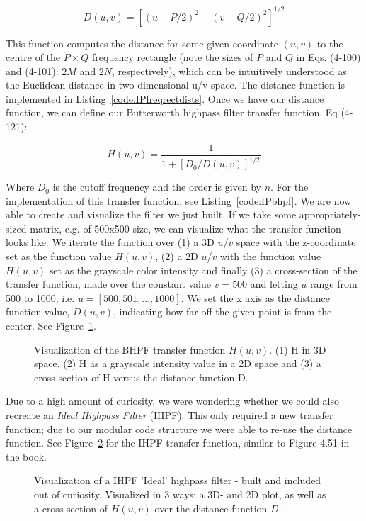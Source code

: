 \documentclass{article}
\begin{document}
\[
D(u,v)=[(u-P/2)^2+(v-Q/2)^2]^{1/2}
\]

This function computes the distance for some given coordinate $(u, v)$ to the centre of the $P \times Q$ frequency rectangle (note the sizes of $P$ and $Q$ in Eqs. (4-100) and (4-101): $2M$ and $2N$, respectively), which can be intuitively understood as the Euclidean distance in two-dimensional u/v space. The distance function is implemented in  Listing~\ref{code:IPfreqrectdists}. Once we have our distance function, we can define our Butterworth highpass filter transfer function, Eq (4-121):

\[
H(u, v) = \frac{1}{1+[D_0 / D(u, v)]^{1/2}}
\]

Where $D_0$ is the cutoff frequency and the order is given by $n$. For the implementation of this transfer function, see  Listing~\ref{code:IPbhpf}. We are now able to create and visualize the filter we just built. If we take some appropriately-sized matrix, e.g. of 500x500 size, we can visualize what the transfer function looks like. We iterate the function over (1) a 3D $u$/$v$ space with the z-coordinate set as the function value $H(u, v)$, (2) a 2D $u$/$v$ with the function value $H(u, v)$ set as the grayscale color intensity and finally (3) a cross-section of the transfer function, made over the constant value $v = 500$ and letting $u$ range from 500 to 1000, i.e. $u = [500, 501, ..., 1000]$. We set the x axis as the distance function value, $D(u, v)$, indicating how far off the given point is from the center. See Figure~\ref{fig:bhpf}.

\begin{figure}[ht]
    \centering
    
    \caption{Visualization of the BHPF transfer function $H(u, v)$. (1) H in 3D space, (2) H as a grayscale intensity value in a 2D space and (3) a cross-section of H versus the distance function D.}
    \label{fig:bhpf}
\end{figure}

Due to a high amount of curiosity, we were wondering whether we could also recreate an \textit{Ideal Highpass Filter} (IHPF). This only required a new transfer function; due to our modular code structure we were able to re-use the distance function. See Figure~\ref{fig:ihpf} for the IHPF transfer function, similar to Figure 4.51 in the book.

\begin{figure}[ht]
    \centering
    
    \caption{Visualization of a IHPF 'Ideal' highpass filter - built and included out of curiosity. Visualized in 3 ways: a 3D- and 2D plot, as well as a cross-section of $H(u, v)$ over the distance function $D$.}
    \label{fig:ihpf}
\end{figure}
\end{document}
